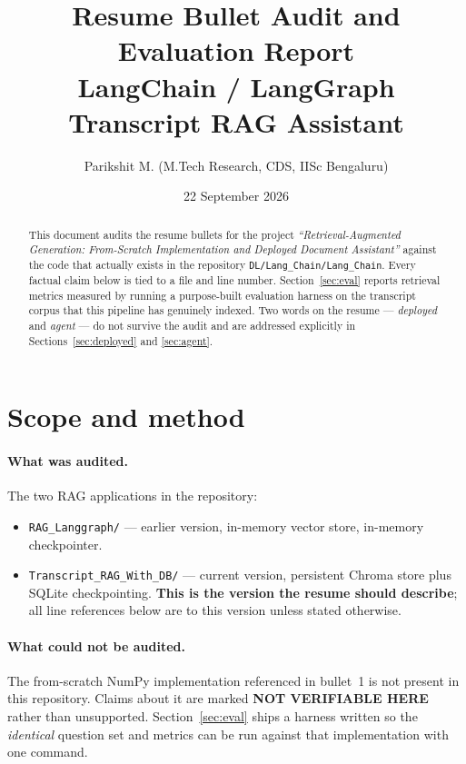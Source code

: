 \documentclass[11pt,a4paper]{article}
\title{\textbf{Resume Bullet Audit and Evaluation Report}\\[2pt]
\large LangChain / LangGraph Transcript RAG Assistant}
\author{Parikshit M. \quad (M.Tech Research, CDS, IISc Bengaluru)}
\date{22 September 2026}
\newcommand{\UNV}{\textcolor{partial}{\textbf{NOT VERIFIABLE HERE}}}
\begin{document}
\maketitle

\begin{abstract}
\noindent
This document audits the resume bullets for the project \emph{``Retrieval-Augmented
Generation: From-Scratch Implementation and Deployed Document Assistant''} against
the code that actually exists in the repository
\texttt{DL/Lang\_Chain/Lang\_Chain}. Every factual claim below is tied to a file and
line number. Section~\ref{sec:eval} reports retrieval metrics measured by running a
purpose-built evaluation harness on the transcript corpus that this pipeline has
genuinely indexed. Two words on the resume --- \emph{deployed} and \emph{agent} ---
do not survive the audit and are addressed explicitly in
Sections~\ref{sec:deployed} and \ref{sec:agent}.
\end{abstract}

\tableofcontents
\vspace{1em}

\section{Scope and method}

\paragraph{What was audited.} The two RAG applications in the repository:
\begin{itemize}
  \item \texttt{RAG\_Langgraph/} --- earlier version, in-memory vector store, in-memory checkpointer.
  \item \texttt{Transcript\_RAG\_With\_DB/} --- current version, persistent Chroma
        store plus SQLite checkpointing. \textbf{This is the version the resume
        should describe}; all line references below are to this version unless
        stated otherwise.
\end{itemize}

\paragraph{What could not be audited.} The from-scratch NumPy implementation
referenced in bullet~1 is not present in this repository. Claims about it are
marked \UNV{} rather than unsupported. Section~\ref{sec:eval} ships a harness
written so the \emph{identical} question set and metrics can be run against that
implementation with one command.
\end{document}

